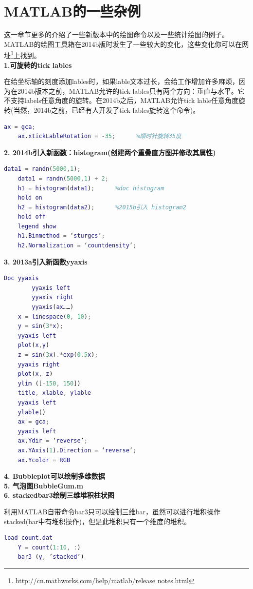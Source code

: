\section{MATLAB的一些杂例 }
    \par
    这一章节更多的介绍了一些新版本中的绘图命令以及一些统计绘图的例子。
    MATLAB的绘图工具箱在2014b版时发生了一些较大的变化，这些变化你可以在网址\footnote{http://cn.mathworks.com/help/matlab/release notes.html}上找到。\\
    \textbf{1.可旋转的tick lables}
    \par
    在给坐标轴的刻度添加lables时，如果lable文本过长，会给工作增加许多麻烦，因为在2014b版本之前，MATLAB允许的tick lables只有两个方向：垂直与水平。它不支持labels任意角度的旋转。在2014b之后，MATLAB允许tick lable任意角度旋转(当然，2014b之前，已经有人开发了tick lables旋转这个命令)。
    \begin{lstlisting}[language=Matlab]
    ax = gca;
    ax.xtickLableRotation = -35;      %顺时针旋转35度
    \end{lstlisting}
    \textbf{2. 2014b引入新函数：histogram(创建两个重叠直方图并修改其属性)}
    \begin{lstlisting}[language=Matlab]
    data1 = randn(5000,1);
    data1 = randn(5000,1) + 2;
    h1 = histogram(data1);      %doc histogram
    hold on
    h2 = histogram(data2);      %2015b引入 histogram2
    hold off
    legend show
    h1.Binmethod = ‘sturgcs’;
    h2.Normalization = ‘countdensity’;
    \end{lstlisting}
    \textbf{3. 2013a引入新函数yyaxis}
    \begin{lstlisting}[language=Matlab]
    Doc yyaxis
        yyaxis left
        yyaxis right
        yyaxis(ax……)
    x = linespace(0, 10);
    y = sin(3*x);
    yyaxis left
    plot(x,y)
    z = sin(3x).*exp(0.5x);
    yyaxis right
    plot(x, z)
    ylim ([-150, 150])
    title, xlable, ylable
    yyaxis left
    ylable()
    ax = gca;
    yyaxis left
    ax.Ydir = ‘reverse’;
    ax.YAxis(1).Direction = ‘reverse’;
    ax.Ycolor = RGB
    \end{lstlisting}
    \textbf{4. Bubbleplot可以绘制多维数据}\\
    \textbf{5. 气泡图BubbleGum.m}\\
    \textbf{6. stackedbar3绘制三维堆积柱状图}
    \par
    利用MATLAB自带命令bar3只可以绘制三维bar，虽然可以进行堆积操作stacked(bar中有堆积操作)，但是此堆积只有一个维度的堆积。
    \begin{lstlisting}[language=Matlab]
    load count.dat
    Y = count(1:10, :)
    bar3 (y, ’stacked’)
    \end{lstlisting}
